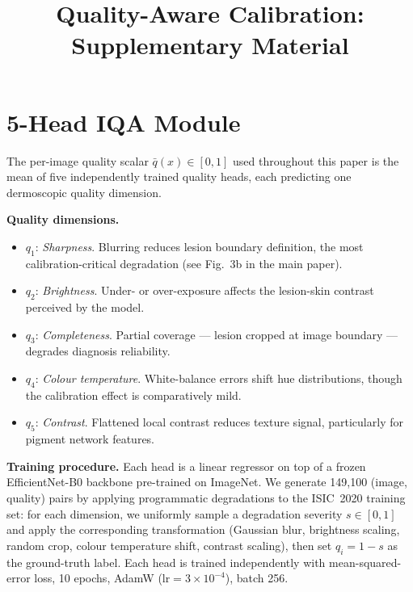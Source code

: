 \documentclass{bmvc2k}
\title{Quality-Aware Calibration:\\
       Supplementary Material}
\newcommand{\qbar}{\bar{q}}
\begin{document}
\maketitle

\setcounter{section}{0}
\renewcommand{\thesection}{A\arabic{section}}
\renewcommand{\thetable}{S\arabic{table}}
\renewcommand{\thefigure}{S\arabic{figure}}

\section{5-Head IQA Module}
\label{app:iqa}

The per-image quality scalar $\qbar(x) \in [0,1]$ used throughout this paper is the mean of five independently trained quality heads, each predicting one dermoscopic quality dimension.

\textbf{Quality dimensions.}
\begin{itemize}[leftmargin=*,itemsep=2pt]
  \item $q_1$: \emph{Sharpness}. Blurring reduces lesion boundary definition, the most calibration-critical degradation (see Fig.~3b in the main paper).
  \item $q_2$: \emph{Brightness}. Under- or over-exposure affects the lesion-skin contrast perceived by the model.
  \item $q_3$: \emph{Completeness}. Partial coverage — lesion cropped at image boundary — degrades diagnosis reliability.
  \item $q_4$: \emph{Colour temperature}. White-balance errors shift hue distributions, though the calibration effect is comparatively mild.
  \item $q_5$: \emph{Contrast}. Flattened local contrast reduces texture signal, particularly for pigment network features.
\end{itemize}

\textbf{Training procedure.}
Each head is a linear regressor on top of a frozen EfficientNet-B0 backbone pre-trained on ImageNet. We generate 149,100 (image, quality) pairs by applying programmatic degradations to the ISIC~2020 training set: for each dimension, we uniformly sample a degradation severity $s \in [0,1]$ and apply the corresponding transformation (Gaussian blur, brightness scaling, random crop, colour temperature shift, contrast scaling), then set $q_i = 1 - s$ as the ground-truth label. Each head is trained independently with mean-squared-error loss, 10 epochs, AdamW ($\text{lr}{=}3{\times}10^{-4}$), batch 256.
\end{document}
